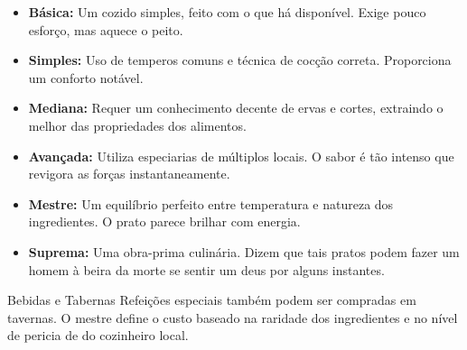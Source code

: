 \begin{itemize}
    \item \textbf{Básica:} Um cozido simples, feito com o que há disponível. Exige pouco esforço, mas aquece o peito.
    \item \textbf{Simples:} Uso de temperos comuns e técnica de cocção correta. Proporciona um conforto notável.
    \item \textbf{Mediana:} Requer um conhecimento decente de ervas e cortes, extraindo o melhor das propriedades dos alimentos.
    \item \textbf{Avançada:} Utiliza especiarias de múltiplos locais. O sabor é tão intenso que revigora as forças instantaneamente.
    \item \textbf{Mestre:} Um equilíbrio perfeito entre temperatura e natureza dos ingredientes. O prato parece brilhar com energia.
    \item \textbf{Suprema:} Uma obra-prima culinária. Dizem que tais pratos podem fazer um homem à beira da morte se sentir um deus por alguns instantes.
\end{itemize}

\begin{rpgboxtips}{Bebidas e Tabernas}
Refeições especiais também podem ser compradas em tavernas. O mestre define o custo baseado na raridade dos ingredientes e no nível de pericia de  do cozinheiro local.
\end{rpgboxtips}
